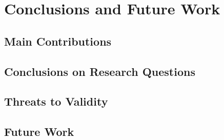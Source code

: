 \chapter{Conclusions and Future Work}
\label{chap:conclusion}

\section{Main Contributions}

\section{Conclusions on Research Questions}

\section{Threats to Validity}

\section{Future Work}